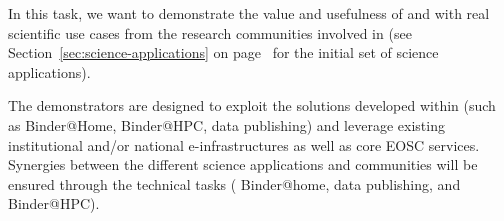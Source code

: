 \begin{task}[
  title=Science demonstrators,
  id=demos,
  lead=MP,
  PM=8,
  partners={IFR,UIO}
]
In this task, we want to demonstrate the value and usefulness of
 and  with real scientific use cases from
the research communities involved in \TheProject (see
Section~\ref{sec:science-applications} on
page~\pageref{sec:science-applications} for the initial set of science applications).

The demonstrators are designed 
to exploit the solutions developed within \TheProject (such as Binder@Home, Binder@HPC,
data publishing) and leverage existing institutional and/or national
e-infrastructures as well as core EOSC services. Synergies between the different
science applications and communities will be ensured through the technical tasks
( Binder@home,
 data publishing, and
 Binder@HPC).




 




\end{task}
